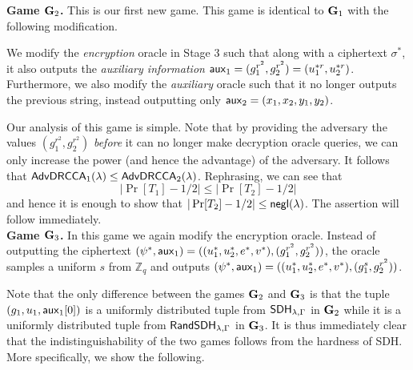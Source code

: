 \textbf{Game $\mathbf{G}_2$.} This is our first new game. This game is identical to $\mathbf{G}_1$ with the following modification.

We modify the \textit{encryption} oracle in Stage $3$ such that along with a ciphertext $\sigma^{*}$, it also outputs the \textit{auxiliary information} $\mathsf{aux}_1 = (g_1^{r^2}, g_2^{r^2}) = (u_1^{*r}, u_2^{*r})$. Furthermore, we also modify the \textit{auxiliary} oracle such that it no longer outputs the previous string, instead outputting only $\mathsf{aux}_2 = (x_1,x_2,y_1,y_2)$. 

Our analysis of this game is simple. Note that by providing the adversary the values $(g_1^{r^2}, g_2^{r^2})$ \textit{before} it can no longer make decryption oracle queries, we can only increase the power (and hence the advantage) of the adversary. It follows that $\mathsf{AdvDRCCA}_1(\lambda)\leq\mathsf{AdvDRCCA}_2(\lambda)$. Rephrasing, we can see that $$|\Pr[T_1]-1/2|\leq|\Pr[T_2]-1/2|$$ and hence it is enough to show that $|\Pr[T_2]-1/2|\leq\mathsf{negl}(\lambda)$. The assertion will follow immediately.\\

\textbf{Game $\mathbf{G}_3$.} In this game we again modify the encryption oracle. Instead of outputting the ciphertext $(\psi^{*}, \mathsf{aux}_1) = ((u_1^{*}, u_2^{*}, e^{*}, v^{*}), (g_1^{r^2}, g_2^{r^2}))$, the oracle samples a uniform $s$ from $\mathbb{Z}_{q}$ and outputs $(\psi^{*}, \mathsf{aux}_1) = ((u_1^{*}, u_2^{*}, e^{*}, v^{*}), (g_1^{s}, g_2^{r^2}))$. 

Note that the only difference between the games $\mathbf{G}_2$ and $\mathbf{G}_3$ is that the tuple $(g_1, u_1, \mathsf{aux}_1[0])$ is a uniformly distributed tuple from $\mathsf{SDH}_{\lambda,\Gamma}$ in $\mathbf{G}_2$ while it is a uniformly distributed tuple from $\mathsf{RandSDH}_{\lambda,\Gamma}$ in $\mathbf{G}_3$. It is thus immediately clear that the indistinguishability of the two games follows from the hardness of SDH. More specifically, we show the following.

